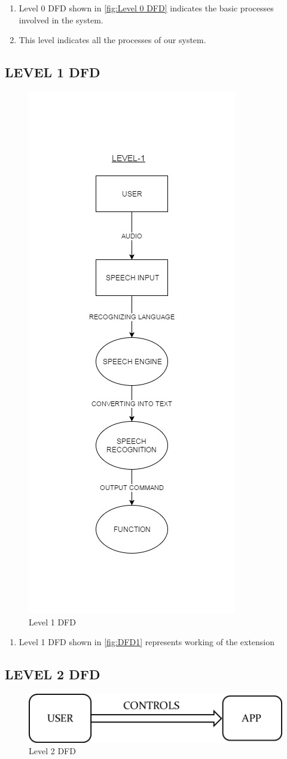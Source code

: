 \documentclass[11pt]{report} %
\begin{document}
\begin{enumerate}
	\item Level 0 DFD shown in \autoref{fig:Level 0 DFD} indicates the basic processes involved in the system.
	\item This level indicates all the processes of our system.
\end{enumerate}

\subsection{LEVEL 1 DFD}
\label{subsec:LEVEL 1 DFD}
\begin{figure}[h]
	\centering
	\includegraphics[width=0.5\linewidth, height=.8\linewidth]{figures/DFD1.jpg}
	\caption{Level 1 DFD}
	\label{fig:DFD1}
\end{figure}

\begin{enumerate}
	\item Level 1 DFD shown in \autoref{fig:DFD1} represents working of the extension
\end{enumerate}

\subsection{LEVEL 2 DFD}
\label{subsec:LEVEL 2 DFD}
\begin{figure}[h]
	\centering
	\includegraphics[width=0.5\linewidth]{figures/DFD2.png}
	\caption{Level 2 DFD}
	\label{fig:DFD2}
\end{figure}
\end{document}
